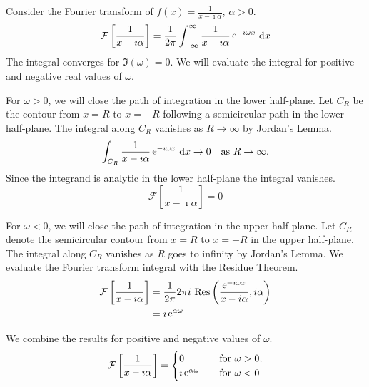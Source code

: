\begin{Example}
  Consider the Fourier transform of $f(x) = \frac{1}{x - \imath \alpha}$, 
  $\alpha > 0$.
  \[ 
  \mathcal{F}\left[\frac{1}{x - \imath \alpha} \right] 
  = \frac{1}{2\pi} \int_{-\infty}^\infty \frac{1}{x - \imath \alpha} \mathop{\mathrm{e}}\nolimits^{-\imath \omega x}\,\mathrm{d} x 
  \]
  The integral converges for $\Im(\omega) = 0$.  We will evaluate the integral
  for positive and negative real values of $\omega$.

  For $\omega > 0$, we will close the path of integration in the lower 
  half-plane.  Let $C_R$ be the contour from $x = R$ to $x = -R$ following a 
  semicircular path in the lower half-plane.  The integral along $C_R$ vanishes
  as $R \to \infty$ by Jordan's Lemma.
  \[ 
  \int_{C_R} \frac{1}{x - \imath \alpha} \mathop{\mathrm{e}}\nolimits^{-\imath \omega x}\,\mathrm{d} x \to 0 \quad 
  \mathrm{as}\ R \to \infty.
  \]
  Since the integrand is analytic in the lower half-plane the integral 
  vanishes.
  \[ 
  \mathcal{F}\left[\frac{1}{x - \imath \alpha} \right] = 0
  \]

  For $\omega < 0$, we will close the path of integration in the upper
  half-plane.  Let $C_R$ denote the semicircular contour from $x=R$ to $x=-R$
  in the upper half-plane.  The integral along $C_R$ vanishes as $R$ goes to
  infinity by Jordan's Lemma.  We evaluate the Fourier transform integral 
  with the Residue Theorem.
  \begin{align*}
    \mathcal{F}\left[\frac{1}{x - \imath \alpha} \right]
    &= \frac{1}{2\pi} 2\pi i\, \mathop{\mathrm{Res}}\nolimits \left( \frac{\mathop{\mathrm{e}}\nolimits^{-\imath \omega x}}{x-i\alpha}, i\alpha \right) 
    \\
    &= \imath \mathop{\mathrm{e}}\nolimits^{\alpha \omega}
  \end{align*}

  We combine the results for positive and negative values of $\omega$.
  \[ 
  \mathcal{F}\left[\frac{1}{x - \imath \alpha} \right] = 
  \begin{cases}
    0 \quad &\mathrm{for}\ \omega > 0, \\
    \imath \mathop{\mathrm{e}}\nolimits^{\alpha \omega} \quad &\mathrm{for}\ \omega < 0
  \end{cases}
  \]
\end{Example}




























